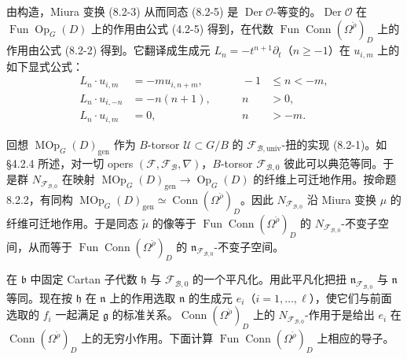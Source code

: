 由构造，Miura 变换 (8.2-3) 从而同态 (8.2-5) 是 $\operatorname{Der}\mathcal O$-等变的。$\operatorname{Der}\mathcal O$ 在 $\operatorname{Fun}\operatorname{Op}_G(D)$ 上的作用由公式 (4.2-5) 得到，在代数 $\operatorname{Fun}\operatorname{Conn}(\Omega^{\check\rho})_D$ 上的作用由公式 (8.2-2) 得到。它翻译成生成元 $L_n=-t^{n+1}\partial_t$（$n\ge-1$）在 $u_{i,m}$ 上的如下显式公式：
\begin{equation}
\begin{aligned}
    L_n\cdot u_{i,m}&=-mu_{i,n+m},&\qquad -1&\le n<-m,\\
    L_n\cdot u_{i,-n}&=-n(n+1),&\qquad n&>0,\\
    L_n\cdot u_{i,m}&=0,&\qquad n&>-m.
\end{aligned}
\tag{8.2-6}
\end{equation}

回想 $\operatorname{MOp}_G(D)_{\mathrm{gen}}$ 作为 $B$-torsor $\mathcal U\subset G/B$ 的 $\mathcal F_{\mathcal B,\mathrm{univ}}$-扭的实现 (8.2-1)。如 §4.2.4 所述，对一切 opers $(\mathcal F,\mathcal F_{\mathcal B},\nabla)$，$B$-torsor $\mathcal F_{\mathcal B,0}$ 彼此可以典范等同。于是群 $N_{\mathcal F_{\mathcal B,0}}$ 在映射 $\operatorname{MOp}_G(D)_{\mathrm{gen}}\to\operatorname{Op}_G(D)$ 的纤维上可迁地作用。按命题 8.2.2，有同构 $\operatorname{MOp}_G(D)_{\mathrm{gen}}\simeq\operatorname{Conn}(\Omega^{\check\rho})_D$。因此 $N_{\mathcal F_{\mathcal B,0}}$ 沿 Miura 变换 $\mu$ 的纤维可迁地作用。于是同态 $\tilde\mu$ 的像等于 $\operatorname{Fun}\operatorname{Conn}(\Omega^{\check\rho})_D$ 的 $N_{\mathcal F_{\mathcal B,0}}$-不变子空间，从而等于 $\operatorname{Fun}\operatorname{Conn}(\Omega^{\check\rho})_D$ 的 $\mathfrak n_{\mathcal F_{\mathcal B,0}}$-不变子空间。

在 $\mathfrak b$ 中固定 Cartan 子代数 $\mathfrak h$ 与 $\mathcal F_{\mathcal B,0}$ 的一个平凡化。用此平凡化把扭 $\mathfrak n_{\mathcal F_{\mathcal B,0}}$ 与 $\mathfrak n$ 等同。现在按 $\mathfrak h$ 在 $\mathfrak n$ 上的作用选取 $\mathfrak n$ 的生成元 $e_i$（$i=1,\dots,\ell$），使它们与前面选取的 $f_i$ 一起满足 $\mathfrak g$ 的标准关系。$\operatorname{Conn}(\Omega^{\check\rho})_D$ 上的 $N_{\mathcal F_{\mathcal B,0}}$-作用于是给出 $e_i$ 在 $\operatorname{Conn}(\Omega^{\check\rho})_D$ 上的无穷小作用。下面计算 $\operatorname{Fun}\operatorname{Conn}(\Omega^{\check\rho})_D$ 上相应的导子。


